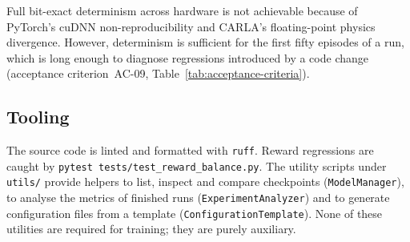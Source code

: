 Full bit-exact determinism across hardware is not achievable because of PyTorch's cuDNN
non-reproducibility and CARLA's floating-point physics divergence. However, determinism is
sufficient for the first fifty episodes of a run, which is long enough to diagnose regressions
introduced by a code change (acceptance criterion~AC-09, Table~\ref{tab:acceptance-criteria}).

\subsection{Tooling}\label{sec:impl-tooling}

The source code is linted and formatted with \texttt{ruff}. Reward regressions are caught by
\texttt{pytest tests/test\_reward\_balance.py}. The utility scripts under \texttt{utils/}
provide helpers to list, inspect and compare checkpoints (\texttt{ModelManager}), to analyse
the metrics of finished runs (\texttt{ExperimentAnalyzer}) and to generate configuration files
from a template (\texttt{ConfigurationTemplate}). None of these utilities are required for
training; they are purely auxiliary.

\clearpage
